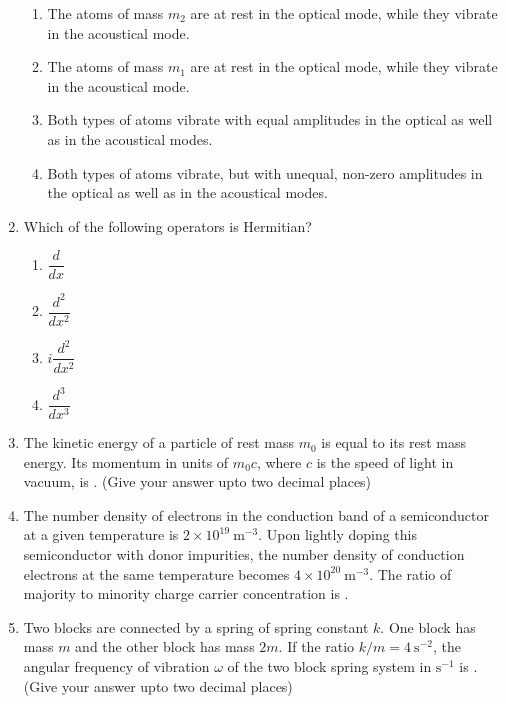 \documentclass[journal,12pt,onecolumn]{IEEEtran}
\theoremstyle{remark}
\begin{document}
\begin{enumerate}
\begin{enumerate}
    \item The atoms of mass $m_2$ are at rest in the optical mode, while they vibrate in the acoustical mode.
    \item The atoms of mass $m_1$ are at rest in the optical mode, while they vibrate in the acoustical mode.
    \item Both types of atoms vibrate with equal amplitudes in the optical as well as in the acoustical modes.
    \item Both types of atoms vibrate, but with unequal, non-zero amplitudes in the optical as well as in the acoustical modes.
\end{enumerate}

\item Which of the following operators is Hermitian?

\begin{multicols}{4}
\begin{enumerate}
    \item $\dfrac{d}{dx}$
    \item $\dfrac{d^2}{dx^2}$
    \item $i\dfrac{d^2}{dx^2}$
    \item $\dfrac{d^3}{dx^3}$
\end{enumerate}
\end{multicols}


\item The kinetic energy of a particle of rest mass $m_0$ is equal to its rest mass energy. Its momentum in units of $m_0c$, where $c$ is the speed of light in vacuum, is \underline{\hspace{2cm}}. (Give your answer upto two decimal places)

\item The number density of electrons in the conduction band of a semiconductor at a given temperature is $2 \times 10^{19}~\mathrm{m}^{-3}$. Upon lightly doping this semiconductor with donor impurities, the number density of conduction electrons at the same temperature becomes $4 \times 10^{20}~\mathrm{m}^{-3}$. The ratio of majority to minority charge carrier concentration is \underline{\hspace{2cm}}.

\item Two blocks are connected by a spring of spring constant $k$. One block has mass $m$ and the other block has mass $2m$. If the ratio $k/m = 4~\mathrm{s}^{-2}$, the angular frequency of vibration $\omega$ of the two block spring system in $\mathrm{s}^{-1}$ is \underline{\hspace{2cm}}. (Give your answer upto two decimal places)


\end{enumerate}
\end{document}
